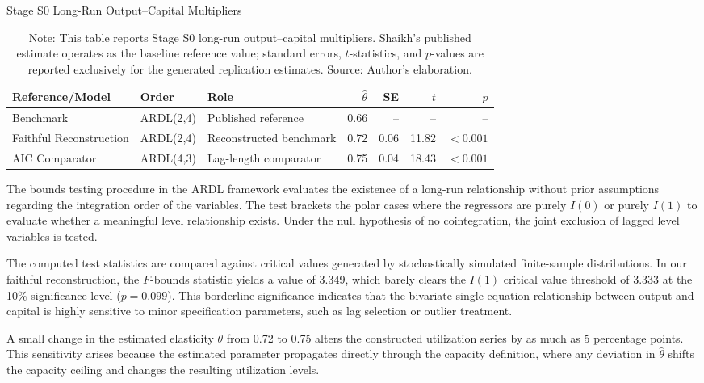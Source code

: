 \documentclass[11pt]{article}
\begin{document}
\begin{table}[H]
\centering
\caption{Stage S0 Long-Run Output--Capital Multipliers}
\label{tab:s0_model_lr_summary}
\footnotesize
\begin{tabular}{lllrrrr}
\toprule
Reference/Model & Order & Role & $\hat{\theta}$ & SE & $t$ & $p$ \\
\midrule
\midrule
\citet{Shaikh2016} Benchmark & ARDL(2,4) & Published reference & 0.66 & -- & -- & -- \\
Faithful Reconstruction & ARDL(2,4) & Reconstructed benchmark & 0.72 & 0.06 & 11.82 & $<0.001$ \\
AIC Comparator & ARDL(4,3) & Lag-length comparator & 0.75 & 0.04 & 18.43 & $<0.001$ \\
\bottomrule
\end{tabular}
\caption*{Note: This table reports Stage S0 long-run output--capital multipliers. Shaikh's published estimate operates as the baseline reference value; standard errors, $t$-statistics, and $p$-values are reported exclusively for the generated replication estimates. Source: Author's elaboration.}
\end{table}

The bounds testing procedure in the ARDL framework evaluates the existence of a long-run relationship without prior assumptions regarding the integration order of the variables. The test brackets the polar cases where the regressors are purely $I(0)$ or purely $I(1)$ to evaluate whether a meaningful level relationship exists. Under the null hypothesis of no cointegration, the joint exclusion of lagged level variables is tested.

The computed test statistics are compared against critical values generated by stochastically simulated finite-sample distributions. In our faithful reconstruction, the $F$-bounds statistic yields a value of 3.349, which barely clears the $I(1)$ critical value threshold of 3.333 at the 10\% significance level ($p=0.099$). This borderline significance indicates that the bivariate single-equation relationship between output and capital is highly sensitive to minor specification parameters, such as lag selection or outlier treatment.

A small change in the estimated elasticity $\theta$ from 0.72 to 0.75 alters the constructed utilization series by as much as 5 percentage points. This sensitivity arises because the estimated parameter propagates directly through the capacity definition, where any deviation in $\hat{\theta}$ shifts the capacity ceiling and changes the resulting utilization levels. 
\end{document}
